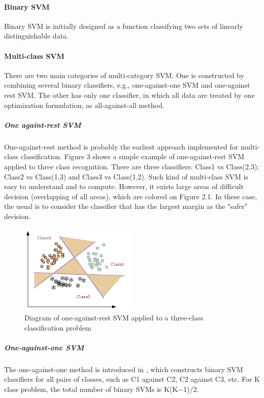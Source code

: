 \documentclass[]{article}
\begin{document}
\paragraph{Binary SVM}
Binary SVM is initially designed as a function classifying two sets of linearly
distinguishable  data. 
\paragraph{Multi-class SVM}
There  are  two  main  categories  of  multi-category  SVM.  One  is  constructed  by combining several binary classifiers, e.g., one-against-one SVM and one-against rest SVM. The other has only one classifier, in which all data are treated by one optimization formulation, as all-against-all method\cite{hsu2002comparison}.

\subparagraph{One againt-rest SVM}
One-against-rest method is probably the earliest approach implemented for multi-
class classification. Figure 3 shows a simple example of one-against-rest SVM applied to three class  recognition.   There  are  three  classifiers:  Class1  vs  Class(2,3);  Class2  vs Class(1,3) and Class3 vs Class(1,2).   Such kind of multi-class SVM is easy to understand and to compute.   However,  it exists large areas of difficult decision (overlapping of all areas), which are colored on Figure 2.1. In these case, the usual is to consider the classifier that has the largest margin as the "safer" decision.

\begin{figure}[h!]
	\centering
	\includegraphics[width=0.5\textwidth]{one_against_rest.png}
	\caption{Diagram of one-against-rest SVM applied to a three-class classification problem}
\end{figure} 

\subparagraph{One-against-one SVM}
The one-against-one method is introduced in\cite{knerr1990single} , which constructs binary SVM classifiers for all pairs of classes, such as C1 against C2, C2 against C3, etc. For K class problem, the total number of binary SVMs is K(K−1)/2.
\end{document}
